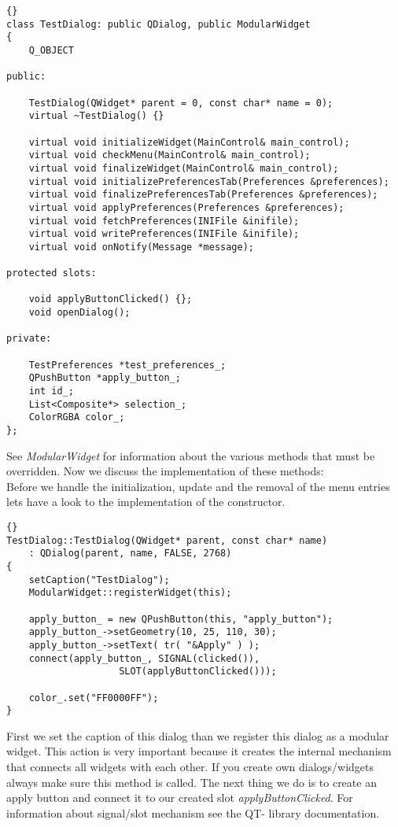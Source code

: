 \begin{lstlisting}{}
class TestDialog: public QDialog, public ModularWidget
{
	Q_OBJECT

public:

	TestDialog(QWidget* parent = 0, const char* name = 0);
	virtual ~TestDialog() {}

	virtual void initializeWidget(MainControl& main_control);
	virtual void checkMenu(MainControl& main_control);
	virtual void finalizeWidget(MainControl& main_control);
	virtual void initializePreferencesTab(Preferences &preferences);
	virtual void finalizePreferencesTab(Preferences &preferences);
	virtual void applyPreferences(Preferences &preferences);
	virtual void fetchPreferences(INIFile &inifile);
	virtual void writePreferences(INIFile &inifile);
	virtual void onNotify(Message *message);

protected slots:
			
	void applyButtonClicked() {};
	void openDialog();

private:

	TestPreferences *test_preferences_;
	QPushButton *apply_button_;
	int id_;
	List<Composite*> selection_;
	ColorRGBA color_;
};
\end{lstlisting}

See {\em ModularWidget} for information about the various methods that must be
overridden.
Now we discuss the implementation of these methods:\\

Before we handle the initialization, update and the removal of the menu entries lets
have a look to the implementation of the constructor.

\begin{lstlisting}{}
TestDialog::TestDialog(QWidget* parent, const char* name)
	: QDialog(parent, name, FALSE, 2768)
{
	setCaption("TestDialog");
	ModularWidget::registerWidget(this);

	apply_button_ = new QPushButton(this, "apply_button");
	apply_button_->setGeometry(10, 25, 110, 30);
	apply_button_->setText( tr( "&Apply" ) );
	connect(apply_button_, SIGNAL(clicked()), 
					SLOT(applyButtonClicked()));

	color_.set("FF0000FF");
}
\end{lstlisting}

First we set the caption of this dialog than we register this dialog as a modular
widget. This action is very important because it creates the internal mechanism
that connects all widgets with each other. If you create own dialogs/widgets always
make sure this method is called.
The next thing we do is to create an apply button and connect it to our created slot
{\em applyButtonClicked}. For information about signal/slot mechanism see the QT-
library documentation.\\

